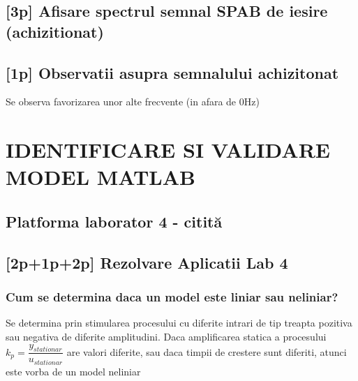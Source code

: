 \documentclass[12pt,english]{article}
\begin{document}
\subsection { [3p] Afisare spectrul semnal SPAB de iesire (achizitionat) }

\begin{center}
\end{center}

\subsection {[1p] Observatii asupra semnalului achizitonat }
Se observa favorizarea unor alte frecvente (in afara de 0Hz)

\section {IDENTIFICARE SI VALIDARE MODEL MATLAB }
\subsection {Platforma laborator 4 - citită}
\subsection {[2p+1p+2p] Rezolvare Aplicatii Lab 4 }
\subsubsection {Cum se determina daca un model este liniar sau neliniar?}
Se determina prin stimularea procesului cu diferite intrari de tip treapta pozitiva sau negativa de diferite amplitudini. Daca amplificarea statica a procesului $k_p = \dfrac{y_{stationar}}{u_{stationar}}$ are valori diferite, sau daca timpii de crestere sunt diferiti, atunci este vorba de un model neliniar
\end{document}
